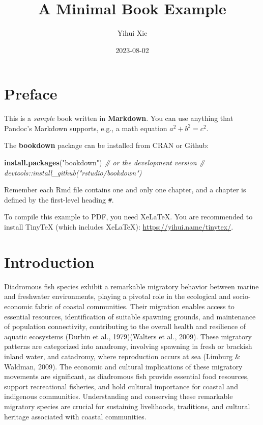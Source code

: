 \documentclass[
]{book}
\title{A Minimal Book Example}
\author{Yihui Xie}
\date{2023-08-02}
\newenvironment{Shaded}{\begin{snugshade}}{\end{snugshade}}
\newcommand{\CommentTok}[1]{\textcolor[rgb]{0.56,0.35,0.01}{\textit{#1}}}
\newcommand{\FunctionTok}[1]{\textcolor[rgb]{0.13,0.29,0.53}{\textbf{#1}}}
\newcommand{\NormalTok}[1]{#1}
\newcommand{\StringTok}[1]{\textcolor[rgb]{0.31,0.60,0.02}{#1}}
\begin{document}
\maketitle

{
\setcounter{tocdepth}{1}
\tableofcontents
}
\hypertarget{preface}{%
\chapter{Preface}\label{preface}}

This is a \emph{sample} book written in \textbf{Markdown}. You can use anything that Pandoc's Markdown supports, e.g., a math equation \(a^2 + b^2 = c^2\).

The \textbf{bookdown} package can be installed from CRAN or Github:

\begin{Shaded}
\begin{Highlighting}[]
\FunctionTok{install.packages}\NormalTok{(}\StringTok{"bookdown"}\NormalTok{)}
\CommentTok{\# or the development version}
\CommentTok{\# devtools::install\_github("rstudio/bookdown")}
\end{Highlighting}
\end{Shaded}

Remember each Rmd file contains one and only one chapter, and a chapter is defined by the first-level heading \texttt{\#}.

To compile this example to PDF, you need XeLaTeX. You are recommended to install TinyTeX (which includes XeLaTeX): \url{https://yihui.name/tinytex/}.

\hypertarget{introduction}{%
\chapter{Introduction}\label{introduction}}

Diadromous fish species exhibit a remarkable migratory behavior between marine and freshwater environments, playing a pivotal role in the ecological and socio-economic fabric of coastal communities. Their migration enables access to essential resources, identification of suitable spawning grounds, and maintenance of population connectivity, contributing to the overall health and resilience of aquatic ecosystems (Durbin et al., 1979)(Walters et al., 2009). These migratory patterns are categorized into anadromy, involving spawning in fresh or brackish inland water, and catadromy, where reproduction occurs at sea (Limburg \& Waldman, 2009). The economic and cultural implications of these migratory movements are significant, as diadromous fish provide essential food resources, support recreational fisheries, and hold cultural importance for coastal and indigenous communities. Understanding and conserving these remarkable migratory species are crucial for sustaining livelihoods, traditions, and cultural heritage associated with coastal communities.
\end{document}
